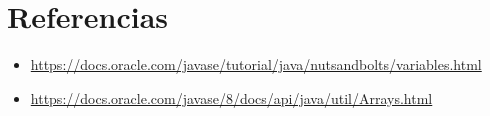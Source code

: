 \documentclass{article}
\begin{document}
\clearpage


\section{Referencias}
\begin{itemize}			
	\item \url{https://docs.oracle.com/javase/tutorial/java/nutsandbolts/variables.html}
    \item \url{https://docs.oracle.com/javase/8/docs/api/java/util/Arrays.html}
\end{itemize}	
	
%
%
%
			
\end{document}
